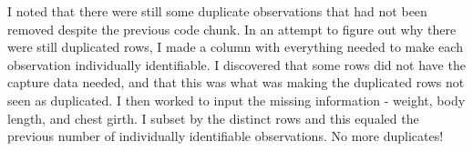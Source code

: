 \documentclass[]{article}
\newenvironment{Shaded}{\begin{snugshade}}{\end{snugshade}}
\newcommand{\CommentTok}[1]{\textcolor[rgb]{0.56,0.35,0.01}{\textit{#1}}}
\newcommand{\NormalTok}[1]{#1}
\newcommand{\OperatorTok}[1]{\textcolor[rgb]{0.81,0.36,0.00}{\textbf{#1}}}
\newcommand{\OtherTok}[1]{\textcolor[rgb]{0.56,0.35,0.01}{#1}}
\newcommand{\StringTok}[1]{\textcolor[rgb]{0.31,0.60,0.02}{#1}}
\begin{document}
\begin{Shaded}
\end{Shaded}

I noted that there were still some duplicate observations that had not
been removed despite the previous code chunk. In an attempt to figure
out why there were still duplicated rows, I made a column with
everything needed to make each observation individually identifiable. I
discovered that some rows did not have the capture data needed, and that
this was what was making the duplicated rows not seen as duplicated. I
then worked to input the missing information - weight, body length, and
chest girth. I subset by the distinct rows and this equaled the previous
number of individually identifiable observations. No more duplicates!
\end{document}
